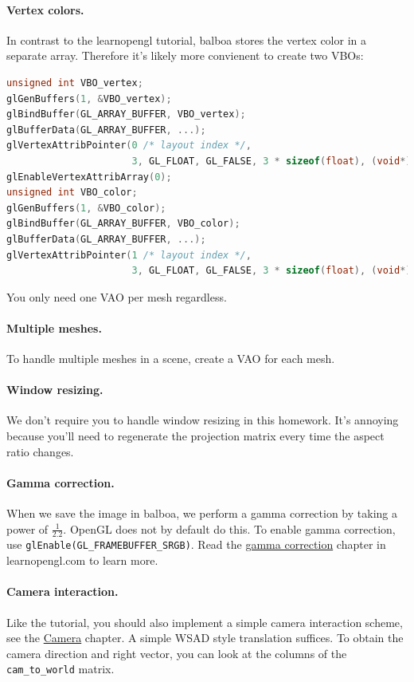\paragraph{Vertex colors.} In contrast to the learnopengl tutorial, balboa stores the vertex color in a separate array. Therefore it's likely more convienent to create two VBOs:
\begin{lstlisting}[language=C++]
unsigned int VBO_vertex;
glGenBuffers(1, &VBO_vertex);
glBindBuffer(GL_ARRAY_BUFFER, VBO_vertex);
glBufferData(GL_ARRAY_BUFFER, ...);
glVertexAttribPointer(0 /* layout index */,
                      3, GL_FLOAT, GL_FALSE, 3 * sizeof(float), (void*)0);
glEnableVertexAttribArray(0);
unsigned int VBO_color;
glGenBuffers(1, &VBO_color);
glBindBuffer(GL_ARRAY_BUFFER, VBO_color);
glBufferData(GL_ARRAY_BUFFER, ...);
glVertexAttribPointer(1 /* layout index */,
                      3, GL_FLOAT, GL_FALSE, 3 * sizeof(float), (void*)0);
\end{lstlisting}
You only need one VAO per mesh regardless.

\paragraph{Multiple meshes.} To handle multiple meshes in a scene, create a VAO for each mesh.

\paragraph{Window resizing.} We don't require you to handle window resizing in this homework. It's annoying because you'll need to regenerate the projection matrix every time the aspect ratio changes.

\paragraph{Gamma correction.} When we save the image in balboa, we perform a gamma correction by taking a power of $\frac{1}{2.2}$. OpenGL does not by default do this. To enable gamma correction, use \lstinline{glEnable(GL_FRAMEBUFFER_SRGB)}. Read the \href{https://learnopengl.com/Advanced-Lighting/Gamma-Correction}{gamma correction} chapter in learnopengl.com to learn more.

\paragraph{Camera interaction.} Like the tutorial, you should also implement a simple camera interaction scheme, see the \href{https://learnopengl.com/Getting-started/Camera}{Camera} chapter. A simple WSAD style translation suffices. To obtain the camera direction and right vector, you can look at the columns of the \lstinline{cam_to_world} matrix.

